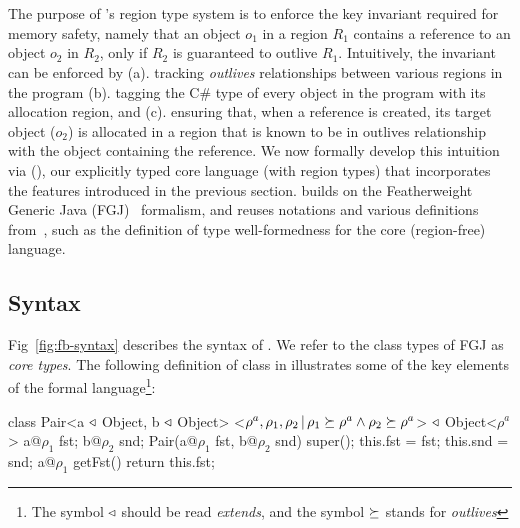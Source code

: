 \section{\fbname}
\label{sec:type-system}



The purpose of \name's region type system is to enforce the key
invariant required for memory safety, namely that an object $o_1$ in a
region $R_1$ contains a reference to an object $o_2$ in $R_2$, only if
$R_2$ is guaranteed to outlive $R_1$. Intuitively, the invariant can
be enforced by (a). tracking \emph{outlives} relationships between
various regions in the program (b). tagging the C\# type of every
object in the program with its allocation region, and (c).  ensuring
that, when a reference is created, its target object ($o_2$) is
allocated in a region that is known to be in outlives relationship
with the object containing the reference. We now formally develop this
intuition via \fbname (\FB), our explicitly typed core language (with region
types) that incorporates the features introduced in the previous
section. \fbname builds on the Featherweight Generic Java
(FGJ)~\cite{fgj} formalism, and reuses notations and various
definitions from~\cite{fgj}, such as the definition of type
well-formedness for the core (region-free) language. 


\subsection{Syntax}
\label{sec:fb-syntax}

Fig~\ref{fig:fb-syntax} describes the syntax of \FB.
We refer to the class types of FGJ as \emph{core types}.
%
The following definition of  class in \FB illustrates some
of the key elements of the formal language\footnote{The symbol
$\triangleleft$ should be read \emph{extends}, and the symbol $\succeq$
stands for \emph{outlives}}:
\begin{codejava}[mathescape=true]
class Pair<a $\triangleleft$ Object, b $\triangleleft$ Object>
          <$\rho^a, \rho_1, \rho_2 \,|\, \rho_1 \succeq \rho^a \wedge \rho_2 \succeq \rho^a$> $\triangleleft$ Object<$\rho^a$> {
  a@$\rho_1$ fst; 
  b@$\rho_2$ snd;
  Pair(a@$\rho_1$ fst, b@$\rho_2$ snd) {
    super(); this.fst = fst; this.snd = snd;
  }
  a@$\rho_1$ getFst() { 
    return this.fst; 
  }
}
\end{codejava}
\vspace*{-0.15in}

